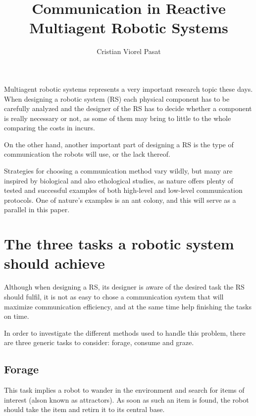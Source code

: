 \documentclass[12pt]{report}
\begin{document}
\author{Cristian Viorel Pasat}
\title{Communication in Reactive Multiagent Robotic Systems}
\maketitle




Multiagent robotic systems represents a very important  research topic these days. 
When designing a robotic system (RS) each physical component has to be carefully analyzed and the designer of the RS has to decide whether a component is really necessary or not, as some of them may bring to little to the whole comparing the costs in incurs.


On the other hand, another important part of designing a RS is the type of communication the robots will use, or the lack thereof.

Strategies for choosing a communication method vary wildly, but many are inspired by biological and also ethological studies, as nature offers  plenty of tested and successful examples of both high-level and low-level communication protocols. One of nature's examples is an ant colony, and this will serve as a parallel in  this paper.




\chapter{The three tasks a robotic system should achieve}

Although when designing a RS, its designer is aware of the desired task the RS should fulfil, 
it is not as easy to chose a communication system that will maximize communication efficiency, and at the same time help finishing the tasks on time.

In order to investigate the different methods used to handle this problem, there are three generic tasks to consider: forage, consume and graze.









\section{Forage}

This task implies a robot to wander in the environment and search for items of interest (alson known as attractors). As soon as such an item is found, the robot should take the item and retirn it to its central base. 
\end{document}
